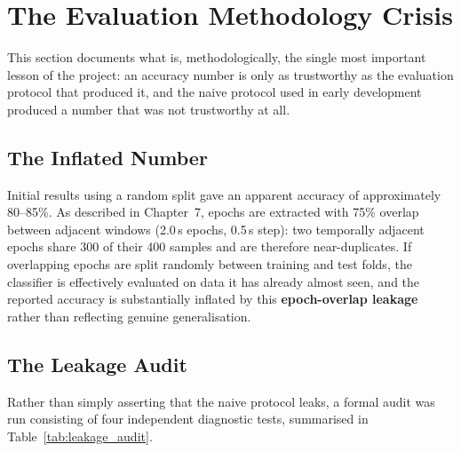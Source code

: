 \section{The Evaluation Methodology Crisis}
\label{sec:cl_leakage}

This section documents what is, methodologically, the single most
important lesson of the project: an accuracy number is only as
trustworthy as the evaluation protocol that produced it, and the
naive protocol used in early development produced a number that
was not trustworthy at all.

\subsection{The Inflated Number}

Initial results using a random  split gave an
apparent accuracy of approximately 80--85\%. As described in
Chapter~7, epochs are extracted with 75\% overlap between adjacent
windows (2.0\,s epochs, 0.5\,s step): two temporally adjacent
epochs share 300 of their 400 samples and are therefore
near-duplicates. If overlapping epochs are split randomly between
training and test folds, the classifier is effectively evaluated on
data it has already almost seen, and the reported accuracy is
substantially inflated by this \textbf{epoch-overlap leakage}
rather than reflecting genuine generalisation.

\subsection{The Leakage Audit}
\label{sec:cl_leakage_audit}

Rather than simply asserting that the naive protocol leaks, a
formal audit was run consisting of four independent diagnostic
tests, summarised in Table~\ref{tab:leakage_audit}.

